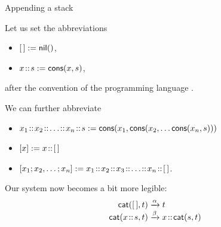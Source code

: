 %
\begin{frame}{Appending a stack}

  Let us set the abbreviations
  \begin{itemize}

    \item \([\,] := \textsf{nil}()\),

    \item \({x}\!::\!{s} := \textsf{cons}(x,s)\),

  \end{itemize}
  after the convention of the programming language \OCaml.

  \bigskip

  We can further abbreviate
  \begin{itemize}

    \item \(\cons{x_1}{\cons{x_2}{\cons{\dots}{\cons{x_n}{s}}}} :=
      \fun{cons}(x_1, \fun{cons}(x_2, \dots \fun{cons}(x_n,s)))\)

    \item \([x] := {x}\!::\!{[\,]}\)

    \item \([x_1; x_2, \dots; x_n] :=
          \cons{x_1}{\cons{x_2}{\cons{x_3}{\cons{\ldots}{\cons{x_n}{\el}}}}}\).

  \end{itemize}

  Our system now becomes a bit more legible:
  \begin{align*}
    \textsf{cat}(        [\,],t) &\xrightarrow{\alpha} t\\
    \textsf{cat}({x}\!::\!{s},t) &\xrightarrow{\smash{\beta}}
    {x}\!::\!{\textsf{cat}(s,t)}
  \end{align*}

\end{frame}

